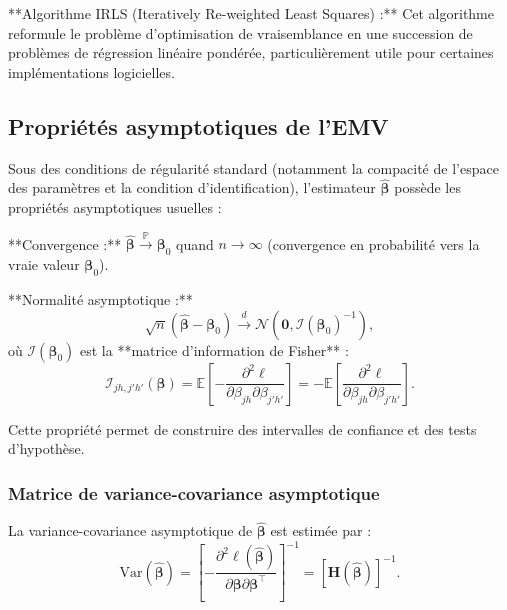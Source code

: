 \documentclass[12pt,a4paper]{article}
\begin{document}
**Algorithme IRLS (Iteratively Re-weighted Least Squares) :** Cet algorithme reformule le problème d'optimisation de vraisemblance en une succession de problèmes de régression linéaire pondérée, particulièrement utile pour certaines implémentations logicielles.

\subsection{Propriétés asymptotiques de l'EMV}

Sous des conditions de régularité standard (notamment la compacité de l'espace des paramètres et la condition d'identification), l'estimateur $\widehat{\boldsymbol{\beta}}$ possède les propriétés asymptotiques usuelles :

**Convergence :** $\widehat{\boldsymbol{\beta}} \xrightarrow{\mathbb{P}} \boldsymbol{\beta}_0$ quand $n \to \infty$ (convergence en probabilité vers la vraie valeur $\boldsymbol{\beta}_0$).

**Normalité asymptotique :** 
\begin{equation}\label{eq:asymptotic-normality}
\sqrt{n}(\widehat{\boldsymbol{\beta}} - \boldsymbol{\beta}_0) \xrightarrow{d} \mathcal{N}\left(\mathbf{0}, \mathcal{I}(\boldsymbol{\beta}_0)^{-1}\right),
\end{equation}
où $\mathcal{I}(\boldsymbol{\beta}_0)$ est la **matrice d'information de Fisher** :
\begin{equation}
\mathcal{I}_{jh,j'h'}(\boldsymbol{\beta}) = \mathbb{E}\left[-\frac{\partial^2 \ell}{\partial \beta_{jh} \partial \beta_{j'h'}}\right] = -\mathbb{E}\left[\frac{\partial^2 \ell}{\partial \beta_{jh} \partial \beta_{j'h'}}\right].
\end{equation}

Cette propriété permet de construire des intervalles de confiance et des tests d'hypothèse.

\subsubsection{Matrice de variance-covariance asymptotique}

La variance-covariance asymptotique de $\widehat{\boldsymbol{\beta}}$ est estimée par :
\begin{equation}\label{eq:vcov}
\widehat{\text{Var}}(\widehat{\boldsymbol{\beta}}) = \left[ -\frac{\partial^2 \ell(\widehat{\boldsymbol{\beta}})}{\partial \boldsymbol{\beta} \partial \boldsymbol{\beta}^\top} \right]^{-1} = \left[ \mathbf{H}(\widehat{\boldsymbol{\beta}}) \right]^{-1}.
\end{equation}
\end{document}
